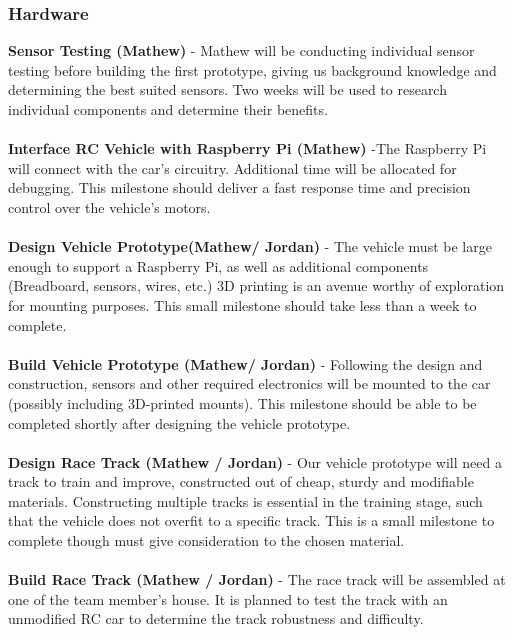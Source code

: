 \documentclass[8pt]{article}
\begin{document}
\subsubsection{Hardware}
\textbf{Sensor Testing (Mathew)} - Mathew will be conducting individual sensor testing before building the first prototype, giving us background knowledge and determining the best suited sensors. Two weeks will be used to research individual components and determine their benefits.
\\\\
\textbf{Interface RC Vehicle with Raspberry Pi (Mathew)} -The Raspberry Pi will connect with the car's circuitry. Additional time will be allocated for debugging. This milestone should deliver a fast response time and precision control over the vehicle’s motors.
\\\\
\textbf{Design Vehicle Prototype(Mathew/ Jordan)} - The vehicle must be large enough to support a Raspberry Pi, as well as additional components (Breadboard, sensors, wires, etc.) 3D printing is an avenue worthy of exploration for mounting purposes. This small milestone should take less than a week to complete.
\\\\
\textbf{Build Vehicle Prototype (Mathew/ Jordan)} - Following the design and construction, sensors and other required electronics will be mounted to the car (possibly including 3D-printed mounts). This milestone should be able to be completed shortly after designing the vehicle prototype.
\\\\
\textbf{Design Race Track (Mathew / Jordan)} - Our vehicle prototype will need a track to train and improve, constructed out of cheap, sturdy and modifiable materials. Constructing multiple tracks is essential in the training stage, such that the vehicle does not overfit to a specific track. This is a small milestone to complete though must give consideration to the chosen material.
\\\\
\textbf{Build Race Track (Mathew  / Jordan)} - The race track will be assembled at one of the team member’s house. It is planned to test the track with an unmodified RC car to determine the track robustness and difficulty.



\newpage


%
%
%
\end{document}
